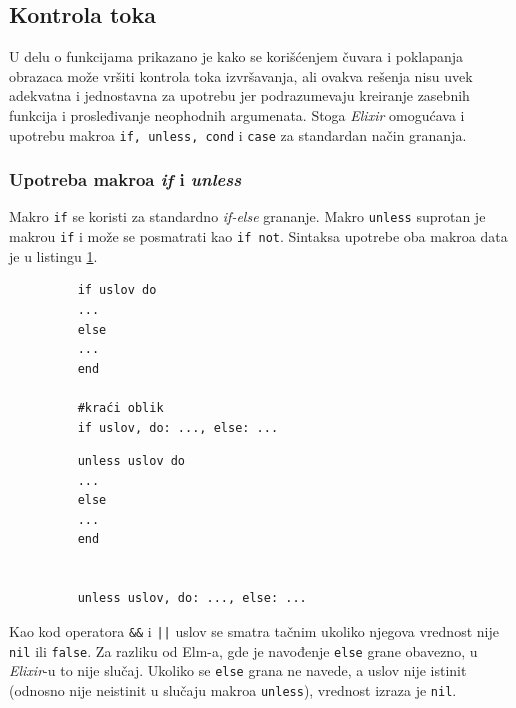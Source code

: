 \documentclass[12pt,oneside]{memoir}
\begin{document}
\subsection{Kontrola toka}
U delu o funkcijama prikazano je kako se korišćenjem čuvara i poklapanja obrazaca može
vršiti kontrola toka izvršavanja, ali ovakva rešenja nisu uvek adekvatna i jednostavna za
upotrebu jer podrazumevaju kreiranje zasebnih funkcija i prosleđivanje neophodnih
argumenata. Stoga \emph{Elixir} omogućava i upotrebu makroa \texttt{if, unless, cond} i
\texttt{case} za standardan način grananja.

\subsubsection{Upotreba makroa \emph{if} i \emph{unless}}
Makro \texttt{if} se koristi za standardno \emph{if-else} grananje. Makro \texttt{unless} suprotan
je makrou \texttt{if} i može se posmatrati kao \texttt{if not}. Sintaksa upotrebe oba makroa data je u listingu
\ref{listing:elixirIf}. 
\begin{figure}[!h]
\begin{minipage}{0.5\textwidth} 
  \centering
  \begin{verbatim}
    if uslov do
    ...
    else
    ...
    end
    
    #kraći oblik
    if uslov, do: ..., else: ...
  \end{verbatim}
\end{minipage}
\begin{minipage}{0.5\textwidth}
  \centering
  \begin{verbatim}
    unless uslov do
    ...
    else
    ...
    end
    

    unless uslov, do: ..., else: ...
  \end{verbatim}
\end{minipage}
\label{listing:elixirIf}
\end{figure}
  
Kao kod operatora \texttt{\&\&} i \texttt{||} uslov se smatra tačnim ukoliko njegova vrednost
nije \texttt{nil} ili \texttt{false}. Za razliku od Elm-a, gde je navođenje \texttt{else} grane
obavezno, u \emph{Elixir}-u to nije slučaj. Ukoliko se \texttt{else} grana ne navede, a uslov nije istinit
(odnosno nije neistinit u slučaju makroa \texttt{unless}), vrednost izraza je \texttt{nil}.
\end{document}
